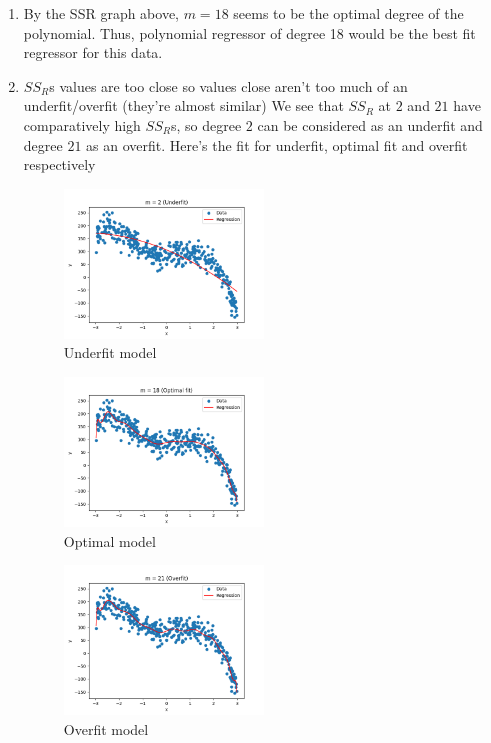 \begin{enumerate}
	\item By the SSR graph above, $m=18$ seems to be the optimal degree of
	      the polynomial. Thus, polynomial regressor of degree 18 would be the
	      best fit regressor for this data.
	\item $SS_R$s values are too close so values close aren't too much of an
	      underfit/overfit (they're almost similar) We see that $SS_R$ at $2$
	      and $21$ have comparatively high $SS_R$s, so degree $2$ can be
	      considered as an underfit and degree $21$ as an overfit. Here's the
	      fit for underfit, optimal fit and overfit respectively
	      \begin{figure}
		      \centering
		      \includegraphics[width=0.5\textwidth]{../images/3/3_underfit.png}
		      \caption{Underfit model}
	      \end{figure}
	      \begin{figure}
		      \centering
		      \includegraphics[width=0.5\textwidth]{../images/3/3_correctfit.png}
		      \caption{Optimal model}
	      \end{figure}
	      \begin{figure}
		      \centering
		      \includegraphics[width=0.5\textwidth]{../images/3/3_overfit.png}
		      \caption{Overfit model}
	      \end{figure}
\end{enumerate}
